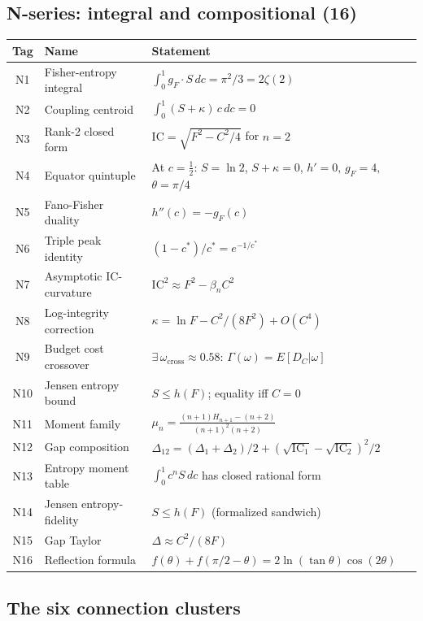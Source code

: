 \documentclass[
  aps,
  prd,
  twocolumn,
  superscriptaddress,
  nofootinbib,
  floatfix
]{revtex4-2}
\newcommand{\Gam}{\Gamma}
\newcommand{\IC}{\mathrm{IC}}
\newcommand{\gF}{g_{\!F}}
\begin{document}
\subsection{N-series: integral and compositional (16)}

\begin{center}
{\small\begin{tabular}{@{}clp{3.8cm}@{}}
\toprule
\textbf{Tag} & \textbf{Name} & \textbf{Statement} \\
\midrule
N1 & Fisher-entropy integral & $\int_0^1 \gF \cdot S\,dc = \pi^2/3 = 2\zeta(2)$ \\
N2 & Coupling centroid & $\int_0^1 (S{+}\kappa)\,c\,dc = 0$ \\
N3 & Rank-2 closed form & $\IC = \sqrt{F^2 - C^2/4}$ for $n = 2$ \\
N4 & Equator quintuple & At $c = \tfrac{1}{2}$: $S = \ln 2$, $S{+}\kappa = 0$, $h' = 0$, $\gF = 4$, $\theta = \pi/4$ \\
N5 & Fano-Fisher duality & $h''(c) = -\gF(c)$ \\
N6 & Triple peak identity & $(1{-}c^*)/c^* = e^{-1/c^*}$ \\
N7 & Asymptotic IC-curvature & $\IC^2 \approx F^2 - \beta_n C^2$ \\
N8 & Log-integrity correction & $\kappa = \ln F - C^2/(8F^2) + O(C^4)$ \\
N9 & Budget cost crossover & $\exists\,\omega_\mathrm{cross} \approx 0.58$: $\Gam(\omega) = E[D_C|\omega]$ \\
N10 & Jensen entropy bound & $S \leq h(F)$; equality iff $C = 0$ \\
N11 & Moment family & $\mu_n = \frac{(n{+}1)H_{n{+}1}{-}(n{+}2)}{(n{+}1)^2(n{+}2)}$ \\
N12 & Gap composition & $\Delta_{12} = (\Delta_1{+}\Delta_2)/2 + (\sqrt{\IC_1}{-}\sqrt{\IC_2})^2\!/2$ \\
N13 & Entropy moment table & $\int_0^1 c^n S\,dc$ has closed rational form \\
N14 & Jensen entropy-fidelity & $S \leq h(F)$ (formalized sandwich) \\
N15 & Gap Taylor & $\Delta \approx C^2/(8F)$ \\
N16 & Reflection formula & $f(\theta) + f(\pi/2{-}\theta) = 2\ln(\tan\theta)\cos(2\theta)$ \\
\bottomrule
\end{tabular}}
\end{center}

\subsection{The six connection clusters}
\end{document}
